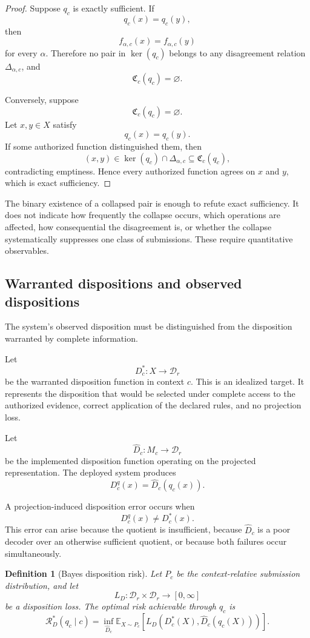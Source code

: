 \documentclass[11pt]{article}
\newtheorem{definition}{Definition}[section]
\theoremstyle{definition}
\newcommand{\E}{\mathbb{E}}
\begin{document}
\begin{proof}
Suppose \(q_c\) is exactly sufficient. If
\[
q_c(x)=q_c(y),
\]
then
\[
f_{\alpha,c}(x)=f_{\alpha,c}(y)
\]
for every \(\alpha\). Therefore no pair in \(\ker(q_c)\) belongs to any disagreement relation \(\Delta_{\alpha,c}\), and
\[
\mathfrak C_c(q_c)=\varnothing.
\]

Conversely, suppose
\[
\mathfrak C_c(q_c)=\varnothing.
\]
Let \(x,y\in X\) satisfy
\[
q_c(x)=q_c(y).
\]
If some authorized function distinguished them, then
\[
(x,y)\in
\ker(q_c)\cap\Delta_{\alpha,c}
\subseteq
\mathfrak C_c(q_c),
\]
contradicting emptiness. Hence every authorized function agrees on \(x\) and \(y\), which is exact sufficiency.
\end{proof}

The binary existence of a collapsed pair is enough to refute exact sufficiency. It does not indicate how frequently the collapse occurs, which operations are affected, how consequential the disagreement is, or whether the collapse systematically suppresses one class of submissions. These require quantitative observables.

\subsection{Warranted dispositions and observed dispositions}

The system's observed disposition must be distinguished from the disposition warranted by complete information.

Let
\[
D_c^{*}:X\to\mathcal D_r
\]
be the warranted disposition function in context \(c\). This is an idealized target. It represents the disposition that would be selected under complete access to the authorized evidence, correct application of the declared rules, and no projection loss.

Let
\[
\widehat D_c:M_c\to\mathcal D_r
\]
be the implemented disposition function operating on the projected representation. The deployed system produces
\[
D_c^{q}(x)
=
\widehat D_c(q_c(x)).
\]

A projection-induced disposition error occurs when
\[
D_c^{q}(x)\neq D_c^{*}(x).
\]
This error can arise because the quotient is insufficient, because \(\widehat D_c\) is a poor decoder over an otherwise sufficient quotient, or because both failures occur simultaneously.

\begin{definition}[Bayes disposition risk]
Let \(P_c\) be the context-relative submission distribution, and let
\[
L_D:\mathcal D_r\times\mathcal D_r\to[0,\infty]
\]
be a disposition loss. The optimal risk achievable through \(q_c\) is
\[
\mathcal R_D^{*}(q_c\mid c)
=
\inf_{\widehat D_c}
\E_{X\sim P_c}
\left[
L_D
\left(
D_c^{*}(X),
\widehat D_c(q_c(X))
\right)
\right].
\]
\end{definition}
\end{document}
